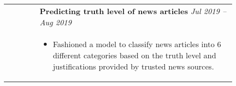 \documentclass[letterpaper, 10pt, oneside]{article}
\newcommand{\bdit}[1]{{\textbf{#1}}}
\begin{document}
\begin{longtable}{@{} p{0.13\linewidth} p{0.8\linewidth}}
                         & \bdit{Predicting truth level of news articles} \hfill \textsl{Jul 2019 -- Aug 2019}                                                                                       \\
                         & \parbox{0.8\textwidth}{                                                                                                                                                   %
        \begin{itemize}[leftmargin=*, itemsep=-0.88ex, topsep=0.2ex]
            \item Fashioned a model to classify news articles into 6 different categories based on the truth level and justifications provided by trusted news sources.
        \end{itemize}
    }                                                                                                                                                                                                \\
    \\[-1ex]




\end{longtable}
\end{document}

